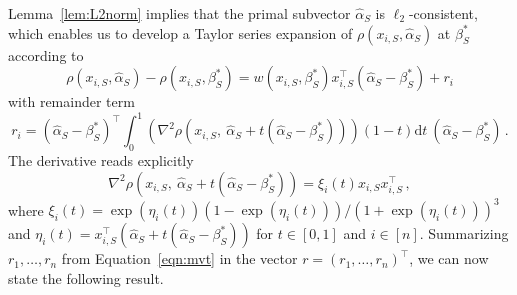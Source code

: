 \documentclass{elsarticle}
\def\d{\mathrm{d}}
\def\T{\top}
\def\d{\mathrm{d}}
\newcommand{\trueparas}{{\beta^*_{S}}}
\newcommand{\prims}{{\hat{\alpha}_{S}}}
\newcommand{\derivafun}{w}
\def\d{\mathrm{d}}
\newcommand{\res}{r}
\begin{document}
\vspace{3mm}
Lemma~\ref{lem:L2norm} implies that the primal subvector $\prims$ is $\ell_2$-consistent, which enables us to develop a Taylor series expansion of $\rho(x_{i,S},\prims)$ at $\trueparas$ according to
\begin{equation}\label{eqn:mvt}
  \rho(x_{i,S},\prims)-\rho(x_{i,S},\trueparas)=\derivafun(x_{i,S},\trueparas) x_{i,S}^\T (\prims-\trueparas)+r_i
\end{equation}
with remainder term
\[r_i=(\prims-\trueparas)^\T \int_0^1(\nabla^2\rho(x_{i,S}, \ \prims+t(\prims-\trueparas)))(1-t)\d t \ (\prims-\trueparas)\,.\]
The derivative reads explicitly
\begin{equation}\label{eqn:ri}
 \nabla^2\rho(x_{i,S},\ \prims+t(\prims-\trueparas))=\xi_i(t) x_{i,S} x_{i,S}^\T\,,
\end{equation}
where $\xi_i(t)=\exp(\eta_i(t))(1-\exp(\eta_i(t)))/
(1+\exp(\eta_i(t)))^3$ and $\eta_i(t)=x_{i,S}^\T (\prims+t(\prims-\trueparas))$
for $t\in[0,1]$ and $i\in [n]$. Summarizing $\res_1,\dots,\res_n$ from Equation~\eqref{eqn:mvt}  in the vector $\res=(r_1,\ldots,r_n)^{\T}$,
we can now state the following result.
\end{document}
